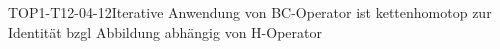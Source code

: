 
\begin{PROP}{TOP1-T12-04-12}{Iterative Anwendung von BC-Operator ist kettenhomotop zur Identität bzgl Abbildung abhängig von H-Operator}
\end{PROP}
